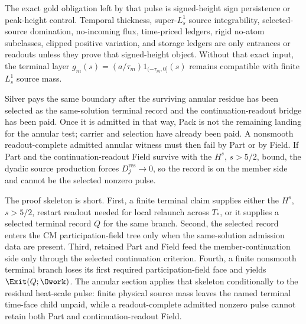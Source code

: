The exact gold obligation left by that pulse is signed-height sign persistence or peak-height control. Temporal thickness, super-\(L^1_s\) source integrability, selected-source domination, no-incoming flux, time-priced ledgers, rigid no-atom subclasses, clipped positive variation, and storage ledgers are only entrances or readouts unless they prove that signed-height object.  Without that exact input, the terminal layer \(g_m(s)=(a/\tau_m)1_{(-\tau_m,0]}(s)\) remains compatible with finite \(L^1_s\) source mass.

Silver pays the same boundary after the surviving annular residue has been selected as the same-solution terminal record and the continuation-readout bridge has been paid.  Once it is admitted in that way, Pack is not the remaining landing for the annular test; carrier and selection have already been paid.  A nonsmooth readout-complete admitted annular witness must then fail by Part or by Field.  If Part and the continuation-readout Field survive with the \(H^s\), \(s>5/2\), bound, the dyadic source production forces \(D_j^{\mathrm{res}}\to0\), so the record is on the member side and cannot be the selected nonzero pulse.

The proof skeleton is short.  First, a finite terminal claim supplies either the \(H^s\), \(s>5/2\), restart readout needed for local relaunch across \(T_*\), or it supplies a selected terminal record \(Q\) for the same branch.  Second, the selected record enters the CM participation-field tree only when the same-solution admission data are present.  Third, retained Part and Field feed the member-continuation side only through the selected continuation criterion.  Fourth, a finite nonsmooth terminal branch loses its first required participation-field face and yields \(\Exit(Q;\Owork)\).  The annular section applies that skeleton conditionally to the residual heat-scale pulse: finite physical source mass leaves the named terminal time-face child unpaid, while a readout-complete admitted nonzero pulse cannot retain both Part and continuation-readout Field.
